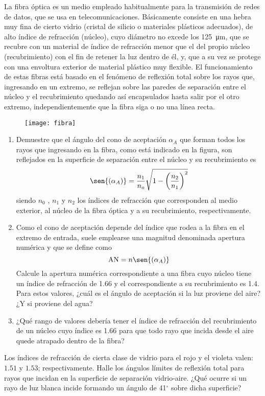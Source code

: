 \item
La fibra óptica es un medio empleado habitualmente para la transmisión de redes de datos, que se usa en telecomunicaciones.
Básicamente consiste en una hebra muy fina de cierto vidrio (cristal de silicio o materiales plásticos adecuados), de alto índice de refracción (núcleo), cuyo diámetro no excede los \SI{125}{\micro\metre}, que se recubre con un material de índice de refracción menor que el del propio núcleo (recubrimiento) con el fin de retener la luz dentro de él, y, que a su vez se protege con una envoltura exterior de material plástico muy flexible.
El funcionamiento de estas fibras está basado en el fenómeno de reflexión total sobre los rayos que, ingresando en un extremo, se reflejan sobre las paredes de separación entre el núcleo y el recubrimiento quedando así encapsulados hasta salir por el otro extremo, independientemente que la fibra siga o no una línea recta.
\begin{figure}[ht]
	\centering{}\texttt{[image: fibra]}
\end{figure}
\begin{enumerate}
	\item Demuestre que el ángulo del cono de aceptación \(\alpha_A\) que forman todos los rayos que ingresando en la fibra, como está indicado en la figura, son reflejados en la superficie de separación entre el núcleo y su recubrimiento es
	\[
		\sen{(\alpha_A)} = \frac{n_1}{n_o} \sqrt{1- \left( \frac{n_2}{n_1} \right)^2 }
	\]
	siendo \(n_0\) , \(n_1\) y \(n_2\) los índices de refracción que corresponden al medio exterior, al núcleo de la fibra óptica y a su recubrimiento, respectivamente.
	\item Como el cono de aceptación depende del índice que rodea a la fibra en el extremo de entrada, suele emplearse una magnitud denominada apertura numérica y que se define como
	\[
		\text{AN} = n \sen{(\alpha_A)}
	\]
	Calcule la apertura numérica correspondiente a una fibra cuyo núcleo tiene un índice de refracción de \num{1.66} y el correspondiente a su recubrimiento es \num{1.4}.
	Para estos valores, ¿cuál es el ángulo de aceptación si la luz proviene del aire? ¿Y si proviene del agua?
	\item ¿Qué rango de valores debería tener el índice de refracción del recubrimiento de un núcleo cuyo índice es \num{1.66} para que todo rayo que incida desde el aire quede atrapado dentro de la fibra?
\end{enumerate}



\item Los índices de refracción de cierta clase de vidrio para el rojo y el violeta valen: $1.51$ y $1.53$; respectivamente.
Halle los ángulos límites de reflexión total para rayos que incidan en la superficie de separación vidrio-aire.
¿Qué ocurre si un rayo de luz blanca incide formando un ángulo de 41$^{\circ}$ sobre dicha superficie?
